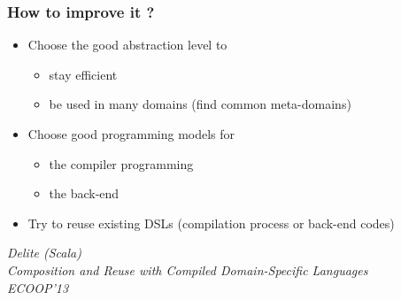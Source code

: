 \documentclass{beamer}
\begin{document}
\begin{frame}
\frametitle{How to improve it ?} %
\begin{itemize}
\item Choose the good abstraction level to
\begin{itemize}
\item stay efficient
\item be used in many domains (find common meta-domains)
\end{itemize}
\item Choose good programming models for
\begin{itemize}
\item the compiler programming
\item the back-end
\end{itemize}
\item Try to reuse existing DSLs (compilation process or back-end codes)
\end{itemize}
\textit{Delite (Scala)\\
Composition and Reuse with Compiled Domain-Specific Languages\\
ECOOP'13}
\end{frame}

\end{document}

